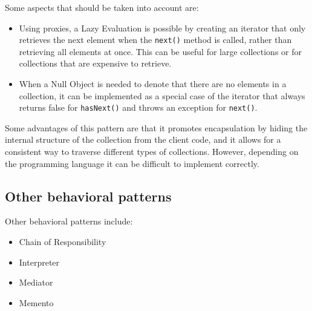 Some aspects that should be taken into account are:
\begin{itemize}
    \item Using proxies, a Lazy Evaluation is possible by creating an iterator that only retrieves the next element when the \texttt{next()} method is called, rather than retrieving all elements at once. This can be useful for large collections or for collections that are expensive to retrieve.
    \item When a Null Object is needed to denote that there are no elements in a collection, it can be implemented as a special case of the iterator that always returns false for \texttt{hasNext()} and throws an exception for \texttt{next()}.
\end{itemize}

Some advantages of this pattern are that it promotes encapsulation by hiding the internal structure of the collection from the client code, and it allows for a consistent way to traverse different types of collections. However, depending on the programming language it can be difficult to implement correctly.




\subsection{Other behavioral patterns}

Other behavioral patterns include:
\begin{itemize}
    \item Chain of Responsibility
    \item Interpreter
    \item Mediator
    \item Memento
\end{itemize}